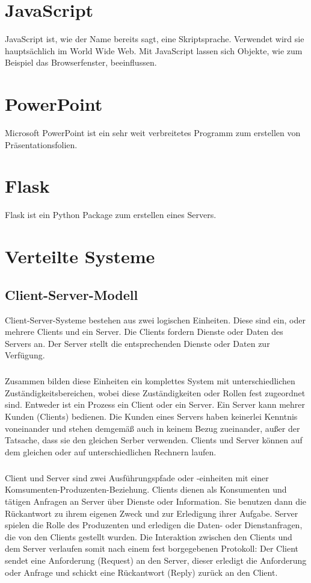\section{JavaScript}\label{sec:javascript}
JavaScript ist, wie der Name bereits sagt, eine Skriptsprache. Verwendet wird
sie hauptsächlich im World Wide Web. Mit JavaScript lassen sich Objekte, wie zum
Beispiel das Browserfenster, beeinflussen. \cite{Steyer2010}

\section{PowerPoint}\label{sec:powerpoint}
Microsoft PowerPoint ist ein sehr weit verbreitetes Programm zum erstellen von
Präsentationsfolien.

\section{Flask}\label{sec:flask}
Flask ist ein Python Package zum erstellen eines Servers.

\section{Verteilte Systeme}\label{sec:verteilte-systeme}

\subsection{Client-Server-Modell}\label{sec:client-server-modell}
Client-Server-Systeme bestehen aus zwei logischen Einheiten. Diese sind ein,
oder mehrere Clients und ein Server. Die Clients fordern Dienste oder Daten des
Servers an. Der Server stellt die entsprechenden Dienste oder Daten zur
Verfügung.

\subparagraph{}
Zusammen bilden diese Einheiten ein komplettes System mit unterschiedlichen
Zuständigkeitsbereichen, wobei diese Zuständigkeiten oder Rollen fest zugeordnet
sind. Entweder ist ein Prozess ein Client oder ein Server. Ein Server kann
mehrer Kunden (Clients) bedienen. Die Kunden eines Servers haben keinerlei
Kenntnis voneinander und stehen demgemäß auch in keinem Bezug zueinander, außer
der Tatsache, dass sie den gleichen Serber verwenden. Clients und Server können
auf dem gleichen oder auf unterschiedlichen Rechnern laufen.

\subparagraph{} 
Client und Server sind zwei Ausführungspfade oder -einheiten mit einer
Komsumenten-Produzenten-Beziehung. Clients dienen als Konsumenten und tätigen
Anfragen an Server über Dienste oder Information. Sie benutzen dann die
Rückantwort zu ihrem eigenen Zweck und zur Erledigung ihrer Aufgabe. Server
spielen die Rolle des Produzenten und erledigen die Daten- oder Dienstanfragen,
die von den Clients gestellt wurden. Die Interaktion zwischen den Clients und
dem Server verlaufen somit nach einem fest borgegebenen Protokoll: Der Client
sendet eine Anforderung (Request) an den Server, dieser erledigt die Anforderung
oder Anfrage und schickt eine Rückantwort (Reply) zurück an den Client.

